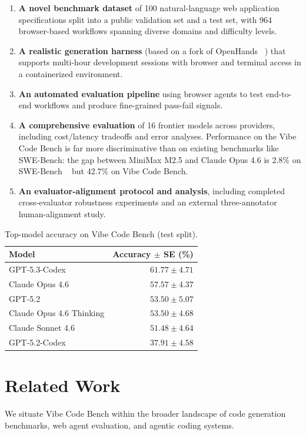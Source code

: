 \begin{enumerate}
    \item \textbf{A novel benchmark dataset} of 100 natural-language web application specifications split into a public validation set and a test set, with 964 browser-based workflows spanning diverse domains and difficulty levels.
    \item \textbf{A realistic generation harness} (based on a fork of OpenHands ~\cite{wang2024openhands}) that supports multi-hour development sessions with browser and terminal access in a containerized environment.
    \item \textbf{An automated evaluation pipeline} using browser agents to test end-to-end workflows and produce fine-grained pass-fail signals.
    \item \textbf{A comprehensive evaluation} of 16 frontier models across providers, including cost/latency tradeoffs and error analyses. Performance on the Vibe Code Bench is far more discriminative than on existing benchmarks like SWE-Bench: the gap between MiniMax M2.5 and Claude Opus 4.6 is 2.8\% on SWE-Bench ~\cite{swebenchleaderboard2026} but 42.7\% on Vibe Code Bench.
    \item \textbf{An evaluator-alignment protocol and analysis}, including completed cross-evaluator robustness experiments and an external three-annotator human-alignment study.
\end{enumerate}
\begin{table}[h]
\caption{Top-model accuracy on Vibe Code Bench (test split).}
\label{tab:headline_accuracy}
\small
\begin{tabular}{@{}lr@{}}
\toprule
\textbf{Model} & \textbf{Accuracy $\pm$ SE (\%)} \\
\midrule
GPT-5.3-Codex & $61.77 \pm 4.71$ \\
Claude Opus 4.6 & $57.57 \pm 4.37$ \\
GPT-5.2 & $53.50 \pm 5.07$ \\
Claude Opus 4.6 Thinking & $53.50 \pm 4.68$ \\
Claude Sonnet 4.6 & $51.48 \pm 4.64$ \\
GPT-5.2-Codex & $37.91 \pm 4.58$ \\
\bottomrule
\end{tabular}
\end{table}




\section{Related Work}
We situate Vibe Code Bench within the broader landscape of code generation benchmarks, web agent evaluation, and agentic coding systems.


